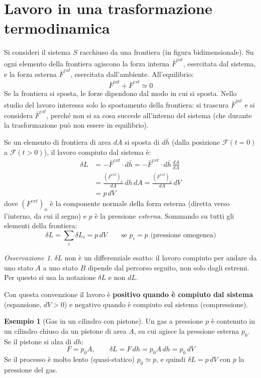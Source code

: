 \documentclass[11pt, a4paper, openright]{book}
\theoremstyle{plain}
\theoremstyle{definition}
\newtheorem{esempio}[teorema]{Esempio}
\theoremstyle{remark}
\newtheorem{osservazione}[teorema]{Osservazione}
\begin{document}
\section{Lavoro in una trasformazione termodinamica}
Si consideri il sistema $S$ racchiuso da una frontiera (in figura bidimensionale). Su ogni elemento della frontiera agiscono la forza interna $\bar{F}^{int}$, esercitata dal sistema, e la forza esterna $\bar{F}^{est}$, esercitata dall'ambiente. All'equilibrio:
\begin{equation}
    \bar{F}^{int} + \bar{F}^{est} \simeq 0
\end{equation}
Se la frontiera si sposta, le forze dipendono dal modo in cui si sposta. Nello studio del lavoro interessa solo lo spostamento della frontiera: si trascura $\bar{F}^{int}$ e si considera $\bar{F}^{est}$, perché non si sa cosa succede all'interno del sistema (che durante la trasformazione può non essere in equilibrio).

Se un elemento di frontiera di area $dA$ si sposta di $d\bar{h}$ (dalla posizione $\mathcal{F}(t = 0)$ a $\mathcal{F}(t > 0)$), il lavoro compiuto dal sistema è:
\begin{align}
    \delta L &= -\bar{F}^{ext}\cdot d\bar{h} = -\bar{F}^{ext}\cdot d\bar{h}\,\frac{dA}{dA} \\
    &= \frac{(F^{ext})_n}{dA}\, dh\, dA = \frac{(F^{ext})_n}{dA}\, dV \\
    &= p\, dV
\end{align}
dove $(F^{ext})_n$ è la componente normale della forza esterna (diretta verso l'interno, da cui il segno) e $p$ è la pressione \emph{esterna}. Sommando su tutti gli elementi della frontiera:
\begin{equation}
    \delta L = \sum_i \delta L_i = p\, dV \qquad \text{se } p_i = p \text{ (pressione omogenea)}
\end{equation}
\begin{osservazione}
    $\delta L$ non è un differenziale esatto: il lavoro compiuto per andare da uno stato $A$ a uno stato $B$ dipende dal percorso seguito, non solo dagli estremi. Per questo si usa la notazione $\delta L$ e non $dL$.
\end{osservazione}

Con questa convenzione il lavoro è \textbf{positivo quando è compiuto dal sistema} (espansione, $dV > 0$) e negativo quando è compiuto sul sistema (compressione).

\begin{esempio}[Gas in un cilindro con pistone]
    Un gas a pressione $p$ è contenuto in un cilindro chiuso da un pistone di area $A$, su cui agisce la pressione esterna $p_0$. Se il pistone si alza di $dh$:
    \begin{equation}
        F = p_0 A, \qquad \delta L = F\, dh = p_0 A\, dh = p_0\, dV
    \end{equation}
    Se il processo è molto lento (quasi-statico) $p_0 \simeq p$, e quindi $\delta L = p\, dV$ con $p$ la pressione del gas.
\end{esempio}
\end{document}
